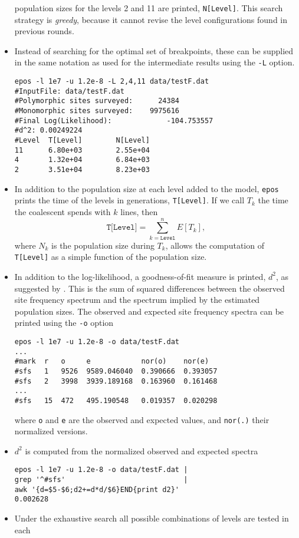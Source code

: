 \documentclass[a4paper, english]{article}
\newcommand{\ty}{\texttt}
\begin{document}
\begin{itemize}
population sizes for the levels 2 and 11 are printed, \ty{N[Level]}. This
search strategy is \emph{greedy}, because it cannot revise the level
configurations found in previous rounds.
\item Instead of searching for the optimal set of breakpoints, these
  can be supplied in the same notation as used for the intermediate
  results using the \texttt{-L} option.
\begin{verbatim}
epos -l 1e7 -u 1.2e-8 -L 2,4,11 data/testF.dat 
#InputFile: data/testF.dat
#Polymorphic sites surveyed:      24384
#Monomorphic sites surveyed:    9975616
#Final Log(Likelihood):             -104.753557
#d^2: 0.00249224
#Level  T[Level]        N[Level]
11      6.80e+03        2.55e+04
4       1.32e+04        6.84e+03
2       3.51e+04        8.23e+03
\end{verbatim}
\item In addition to the population size at each level added to the model, \ty{epos}
  prints the time of the levels in generations, \ty{T[Level]}. If we call $T_k$ the
  time the coalescent spends with $k$ lines, then
  \[
  \ty{T[Level]} = \sum_{k=\ty{Level}}^n E[T_k],
    \]
  where $N_k$ is the population size during $T_k$,
  allows the computation of \ty{T[Level]} as a simple function of the
  population size.
\item In addition to the log-likelihood, a goodness-of-fit measure is
  printed, $d^2$, as suggested by \cite{lap17:acc}. This is the sum of
  squared differences between the observed site frequency spectrum and
  the spectrum implied by the estimated population sizes. The observed
  and expected site frequency spectra can be printed using the \ty{-o}
  option
\begin{verbatim}
epos -l 1e7 -u 1.2e-8 -o data/testF.dat 
...
#mark  r   o     e            nor(o)    nor(e)
#sfs   1   9526  9589.046040  0.390666  0.393057
#sfs   2   3998  3939.189168  0.163960  0.161468
...
#sfs   15  472   495.190548   0.019357  0.020298
\end{verbatim}
where \ty{o} and \ty{e} are the observed and expected values, and
\ty{nor(.)} their normalized versions.
\item $d^2$ is computed from the normalized observed and expected
  spectra
\begin{verbatim}
epos -l 1e7 -u 1.2e-8 -o data/testF.dat | 
grep '^#sfs'                            | 
awk '{d=$5-$6;d2+=d*d/$6}END{print d2}'
0.002628
\end{verbatim}
\item Under the exhaustive search all possible combinations of levels are tested in each

\end{itemize}
\end{document}
